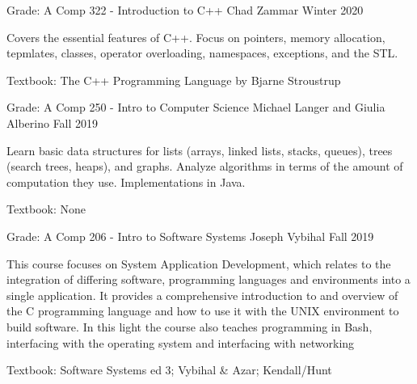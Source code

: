 \begin{cventries}
    \cventry
    {Grade: A} %
    {Comp 322 - Introduction to C++} %
    {Chad Zammar} %
    {Winter 2020} %
    {
      \begin{cvitems} %
      \item {Covers the essential features of C++. Focus on pointers, memory allocation, tepmlates, classes, operator overloading, namespaces, exceptions, and the STL.}
      \item {Textbook: The C++ Programming Language by Bjarne Stroustrup}
      \end{cvitems}
    }

    \cventry
    {Grade: A} %
    {Comp 250 - Intro to Computer Science} %
    {Michael Langer and Giulia Alberino} %
    {Fall 2019} %
    {
      \begin{cvitems} %
      \item {Learn  basic  data  structures  for  lists  (arrays,  linked  lists,  stacks,  queues),  trees  (search trees, heaps), and graphs. Analyze algorithms in terms of the amount of computation they use. Implementations in Java.}
      \item {Textbook: None}
      \end{cvitems}
    }

    \cventry
    {Grade: A} %
    {Comp 206 - Intro to Software Systems} %
    {Joseph Vybihal} %
    {Fall 2019} %
    {
      \begin{cvitems} %
      \item {This course focuses on System Application Development, which relates to the integration of differing software, programming languages and environments into a single application. It provides a comprehensive introduction to and overview of the C programming language and how to use it with the UNIX environment to build software. In this light the course also teaches programming in Bash, interfacing with the operating system and interfacing with networking}
      \item {Textbook: Software Systems ed 3; Vybihal \& Azar; Kendall/Hunt}
      \end{cvitems}
    }

\end{cventries}

